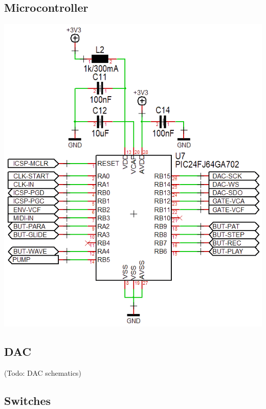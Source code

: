\documentclass{scrartcl}
\begin{document}
\subsection{Microcontroller}

\begin{center}
    \includegraphics[scale=0.55]{assets/schema-mcu.png}
\end{center}

\subsection{DAC}

\begin{center}
    (Todo: DAC schematics)
\end{center}

\subsection{Switches}
\end{document}
